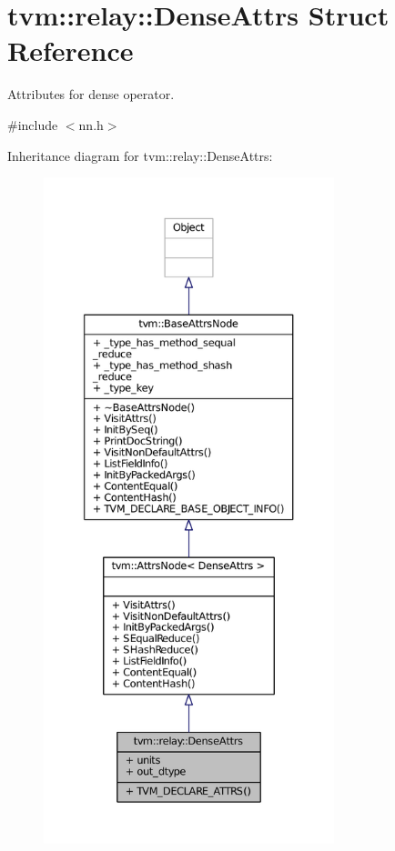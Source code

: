 \hypertarget{structtvm_1_1relay_1_1DenseAttrs}{}\section{tvm\+:\+:relay\+:\+:Dense\+Attrs Struct Reference}
\label{structtvm_1_1relay_1_1DenseAttrs}


Attributes for dense operator.  




{\ttfamily \#include $<$nn.\+h$>$}



Inheritance diagram for tvm\+:\+:relay\+:\+:Dense\+Attrs\+:
\nopagebreak
\begin{figure}[H]
\begin{center}
\leavevmode
\includegraphics[height=550pt]{structtvm_1_1relay_1_1DenseAttrs__inherit__graph}
\end{center}
\end{figure}


